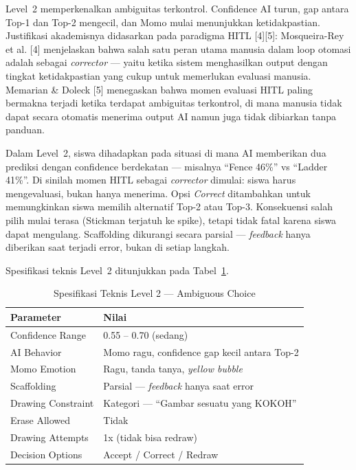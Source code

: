 \documentclass[12pt,oneside]{report}
\begin{document}
Level~2 memperkenalkan ambiguitas terkontrol. Confidence AI turun, gap antara Top-1 dan Top-2 mengecil, dan Momo mulai menunjukkan ketidakpastian. Justifikasi akademisnya didasarkan pada paradigma HITL [4][5]: Mosqueira-Rey et al. [4] menjelaskan bahwa salah satu peran utama manusia dalam loop otomasi adalah sebagai \textit{corrector} --- yaitu ketika sistem menghasilkan output dengan tingkat ketidakpastian yang cukup untuk memerlukan evaluasi manusia. Memarian \& Doleck [5] menegaskan bahwa momen evaluasi HITL paling bermakna terjadi ketika terdapat ambiguitas terkontrol, di mana manusia tidak dapat secara otomatis menerima output AI namun juga tidak dibiarkan tanpa panduan.

Dalam Level~2, siswa dihadapkan pada situasi di mana AI memberikan dua prediksi dengan confidence berdekatan --- misalnya ``Fence 46\%'' vs ``Ladder 41\%''. Di sinilah momen HITL sebagai \textit{corrector} dimulai: siswa harus mengevaluasi, bukan hanya menerima. Opsi \textit{Correct} ditambahkan untuk memungkinkan siswa memilih alternatif Top-2 atau Top-3. Konsekuensi salah pilih mulai terasa (Stickman terjatuh ke spike), tetapi tidak fatal karena siswa dapat mengulang. Scaffolding dikurangi secara parsial --- \textit{feedback} hanya diberikan saat terjadi error, bukan di setiap langkah.

Spesifikasi teknis Level~2 ditunjukkan pada Tabel~\ref{tab:level2-spec}.

\begin{table}[H]
\centering
\caption{Spesifikasi Teknis Level 2 --- Ambiguous Choice}
\label{tab:level2-spec}
\begin{tabular}{|l|l|}
\hline
\textbf{Parameter} & \textbf{Nilai} \\ \hline
Confidence Range & 0.55 -- 0.70 (sedang) \\ \hline
AI Behavior & Momo ragu, confidence gap kecil antara Top-2 \\ \hline
Momo Emotion & Ragu, tanda tanya, \textit{yellow bubble} \\ \hline
Scaffolding & Parsial --- \textit{feedback} hanya saat error \\ \hline
Drawing Constraint & Kategori --- ``Gambar sesuatu yang KOKOH'' \\ \hline
Erase Allowed & Tidak \\ \hline
Drawing Attempts & 1x (tidak bisa redraw) \\ \hline
Decision Options & Accept / Correct / Redraw \\ \hline
\end{tabular}
\end{table}
\end{document}
